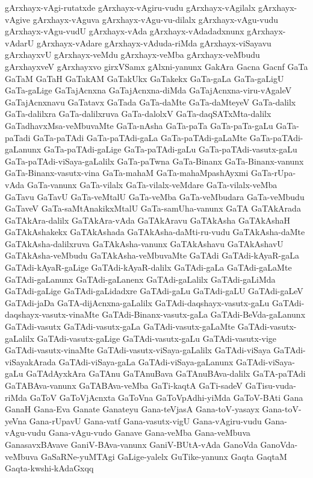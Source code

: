 {gArxhayx-vAgi-rutatxde
gArxhayx-vAgiru-vudu
gArxhayx-vAgilalx
gArxhayx-vAgive
gArxhayx-vAguva
gArxhayx-vAgu-vu-dilalx
gArxhayx-vAgu-vudu
gArxhayx-vAgu-vudU
gArxhayx-vAda
gArxhayx-vAdadadxnunx
gArxhayx-vAdarU
gArxhayx-vAdare
gArxhayx-vAduda-riMda
gArxhayx-viSayavu
gArxhayxvU
gArxhayx-veMdu
gArxhayx-veMba
gArxhayx-veMbudu
gArxhayxveV
gArxhayxvo
girxVSamx
gAlxni-yanunx
GakAra
Gacna
Gacnf
GaTa
GaTaM
GaTaH
GaTakAM
GaTakUkx
GaTakekx
GaTa-gaLa
GaTa-gaLigU
GaTa-gaLige
GaTajAcnxna
GaTajAcnxna-diMda
GaTajAcnxna-viru-vAgaleV
GaTajAcnxnavu
GaTatavx
GaTada
GaTa-daMte
GaTa-daMteyeV
GaTa-dalilx
GaTa-dalilxra
GaTa-dalilxruva
GaTa-dalolxV
GaTa-daqSATxMta-dalilx
GaTadhavxMsa-veMbuvaMte
GaTa-nAsha
GaTa-paTa
GaTa-paTa-gaLu
GaTa-paTadi
GaTa-paTAdi
GaTa-paTAdi-gaLa
GaTa-paTAdi-gaLaMte
GaTa-paTAdi-gaLanunx
GaTa-paTAdi-gaLige
GaTa-paTAdi-gaLu
GaTa-paTAdi-vasutx-gaLu
GaTa-paTAdi-viSaya-gaLalilx
GaTa-paTwna
GaTa-Binanx
GaTa-Binanx-vanunx
GaTa-Binanx-vasutx-vina
GaTa-mahaM
GaTa-mahaMpashAyxmi
GaTa-rUpa-vAda
GaTa-vanunx
GaTa-vilalx
GaTa-vilalx-veMdare
GaTa-vilalx-veMba
GaTavu
GaTavU
GaTa-veMtalU
GaTa-veMba
GaTa-veMbudara
GaTa-veMbudu
GaTaveV
GaTa-saMtAnakikxMtalU
GaTa-samUha-vanunx
GaTA
GaTAkArada
GaTAkAra-dalilx
GaTAkAra-vAda
GaTAkAravu
GaTAkAsha
GaTAkAshaH
GaTAkAshakekx
GaTAkAshada
GaTAkAsha-daMti-ru-vudu
GaTAkAsha-daMte
GaTAkAsha-dalilxruva
GaTAkAsha-vanunx
GaTAkAshavu
GaTAkAshavU
GaTAkAsha-veMbudu
GaTAkAsha-veMbuvaMte
GaTAdi
GaTAdi-kAyaR-gaLa
GaTAdi-kAyaR-gaLige
GaTAdi-kAyaR-dalilx
GaTAdi-gaLa
GaTAdi-gaLaMte
GaTAdi-gaLanunx
GaTAdi-gaLanenx
GaTAdi-gaLalilx
GaTAdi-gaLiMda
GaTAdi-gaLige
GaTAdi-gaLidadxre
GaTAdi-gaLu
GaTAdi-gaLU
GaTAdi-gaLeV
GaTAdi-jaDa
GaTA-dijAcnxna-gaLalilx
GaTAdi-daqshayx-vasutx-gaLu
GaTAdi-daqshayx-vasutx-vinaMte
GaTAdi-Binanx-vasutx-gaLa
GaTAdi-BeVda-gaLanunx
GaTAdi-vasutx
GaTAdi-vasutx-gaLa
GaTAdi-vasutx-gaLaMte
GaTAdi-vasutx-gaLalilx
GaTAdi-vasutx-gaLige
GaTAdi-vasutx-gaLu
GaTAdi-vasutx-vige
GaTAdi-vasutx-vinaMte
GaTAdi-vasutx-viSaya-gaLalilx
GaTAdi-viSaya
GaTAdi-viSayakArada
GaTAdi-viSaya-gaLa
GaTAdi-viSaya-gaLanunx
GaTAdi-viSaya-gaLu
GaTAdAyxkAra
GaTAnu
GaTAnuBava
GaTAnuBAva-dalilx
GaTA-paTAdi
GaTABAva-vanunx
GaTABAva-veMba
GaTi-kaqtA
GaTi-sadeV
GaTisu-vuda-riMda
GaToV
GaToVjAcnxta
GaToVna
GaToVpAdhi-yiMda
GaToV-BAti
Gana
GanaH
Gana-Eva
Ganate
Ganateyu
Gana-teVjasA
Gana-toV-yasayx
Gana-toV-yeVna
Gana-rUpavU
Gana-vatf
Gana-vasutx-vigU
Gana-vAgiru-vudu
Gana-vAgu-vudu
Gana-vAgu-vudo
Ganave
Gana-veMba
Gana-veMbuva
GanasavxBAvave
GaniV-BAva-vanunx
GaniV-BUtA-vAda
GanoVda
GanoVda-veMbuva
GaSaRNe-yuMTAgi
GaLige-yalelx
GuTike-yanunx
Gaqta
GaqtaM
Gaqta-kwshi-kAdaGxqq
}
